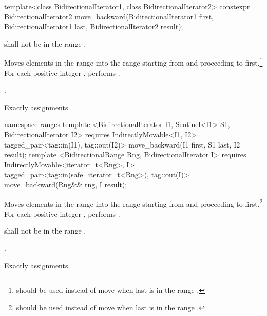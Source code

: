 %
\begin{itemdecl}
template<class BidirectionalIterator1, class BidirectionalIterator2>
  constexpr BidirectionalIterator2
    move_backward(BidirectionalIterator1 first, BidirectionalIterator1 last,
                  BidirectionalIterator2 result);
\end{itemdecl}

\begin{itemdescr}
\pnum
\requires
{}
shall not be in the range
.

\pnum
\effects
Moves elements in the range 
into the
range 
starting from
and proceeding to first.\footnote{
should be used instead of move when last
is in
the range
.}
For each positive integer
,
performs
.

\pnum
\returns
{}.

\pnum
\complexity
Exactly
assignments.
\end{itemdescr}

\begin{addedblock}
%
\begin{itemdecl}
namespace ranges {
  template <BidirectionalIterator I1, Sentinel<I1> S1, BidirectionalIterator I2>
      requires IndirectlyMovable<I1, I2>
    tagged_pair<tag::in(I1), tag::out(I2)> move_backward(I1 first, S1 last, I2 result);
  template <BidirectionalRange Rng, BidirectionalIterator I>
      requires IndirectlyMovable<iterator_t<Rng>, I>
    tagged_pair<tag::in(safe_iterator_t<Rng>), tag::out(I)> move_backward(Rng&& rng, I result);
}
\end{itemdecl}

\begin{itemdescr}
\pnum
\effects
Moves elements in the range 
into the
range 
starting from
and proceeding to first.\footnote{
should be used instead of move when last
is in
the range
.}
For each positive integer
,
performs
.

\pnum
\requires
{}
shall not be in the range
.

\pnum
\returns
{}.

\pnum
\complexity
Exactly
assignments.
\end{itemdescr}
\end{addedblock}

